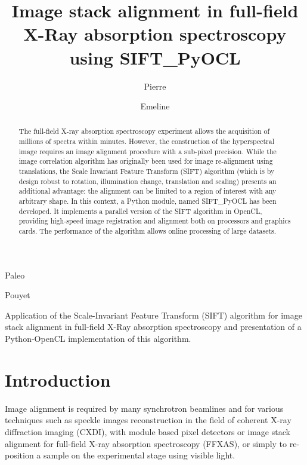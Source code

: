 \documentclass[preprint]{iucr}
\begin{document}
\title{Image stack alignment in full-field X-Ray absorption spectroscopy using
SIFT\_PyOCL}

    \author[a]{Pierre}{Paleo}
    \author[a]{Emeline}{Pouyet}

\maketitle

\begin{synopsis}
Application of the Scale-Invariant Feature Transform (SIFT) algorithm for image
stack alignment in full-field X-Ray absorption spectroscopy and presentation of
a Python-OpenCL implementation of this algorithm.
\end{synopsis}

\begin{abstract}
The full-field X-ray absorption spectroscopy experiment allows the acquisition
of millions of spectra within minutes. 
However, the construction of the hyperspectral image requires an image alignment
procedure with a sub-pixel precision.
While the image correlation algorithm has originally been used for image
re-alignment using translations, the Scale Invariant Feature Transform (SIFT)
algorithm (which is by design robust to rotation, illumination change,
translation and scaling) presents an additional advantage: the alignment can be
limited to a region of interest with any arbitrary shape.
In this context, a Python module, named  SIFT\_PyOCL has been developed.
It implements a parallel version of the SIFT algorithm in OpenCL, providing
high-speed image registration and alignment both on processors and graphics cards.
The performance of the algorithm allows online processing of large datasets.

\end{abstract}

\section{Introduction}

Image alignment is required by many synchrotron beamlines and for
various techniques such as speckle images reconstruction in the field of
coherent X-ray diffraction imaging (CXDI), with module based pixel detectors or
image stack alignment for full-field X-ray absorption spectroscopy (FFXAS), or
simply to re-position a sample on the experimental stage using visible light.
\end{document}

